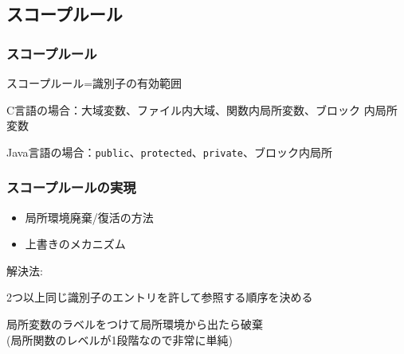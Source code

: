 \documentclass[dvipdfmx]{beamer}
\begin{document}
\subsection{スコープルール}

\begin{frame}
  \frametitle{スコープルール}
  スコープルール=識別子の有効範囲\\
  \begin{trivlist}
    \item C言語の場合：大域変数、ファイル内大域、関数内局所変数、ブロック
    内局所変数
    \item Java言語の場合：{\tt public}、{\tt protected}、{\tt private}、ブロック内局所
  \end{trivlist}
\end{frame}

\begin{frame}
  \frametitle{スコープルールの実現}
  \begin{itemize}
    \item 局所環境廃棄/復活の方法
    \item 上書きのメカニズム
  \end{itemize}

  解決法:
  \begin{list}{}{}
    \item 2つ以上同じ識別子のエントリを許して参照する順序を決める
    \item 局所変数のラベルをつけて局所環境から出たら破棄\\
          (局所関数のレベルが1段階なので非常に単純)\\
  \end{list}
\end{frame}
\end{document}
